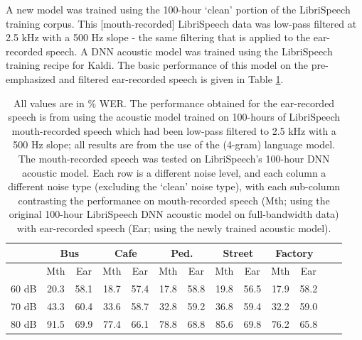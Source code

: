 A new model was trained using the 100-hour `clean' portion of the LibriSpeech training corpus.  This [mouth-recorded] LibriSpeech data was low-pass filtered at 2.5 kHz with a 500 Hz slope - the same filtering that is applied to the ear-recorded speech.  A DNN acoustic model was trained using the LibriSpeech training recipe for Kaldi. The basic performance of this model on the pre-emphasized and filtered ear-recorded speech is given in Table \ref{tab:retrainedDNN}.

\begin{table}[h]
\begin{center}
\begin{tabular}{| c || c | c | c | c | c | c | c | c | c | c | c | c |} \hline
      & \multicolumn{2}{|c|}{Bus} & \multicolumn{2}{|c|}{Cafe} & \multicolumn{2}{|c|}{Ped.} & \multicolumn{2}{|c|}{Street} & \multicolumn{2}{|c|}{Factory} \\ \hline
      & Mth & Ear & Mth & Ear & Mth & Ear & Mth & Ear & Mth & Ear \\ \hline\hline
60 dB & 20.3 & 58.1 & 18.7 & 57.4 & 17.8 & 58.8 & 19.8 & 56.5 & 17.9 & 58.2  \\ \hline
70 dB & 43.3 & 60.4 & 33.6 & 58.7 & 32.8 & 59.2 & 36.8 & 59.4 & 32.2 & 59.0  \\ \hline
80 dB & 91.5 & 69.9 & 77.4 & 66.1 & 78.8 & 68.8 & 85.6 & 69.8 & 76.2 & 65.8  \\ \hline
\end{tabular}
\end{center}
\caption{All values are in \% WER. The performance obtained for the ear-recorded speech is from using the acoustic model trained on 100-hours of LibriSpeech mouth-recorded speech which had been low-pass filtered to 2.5 kHz with a 500 Hz slope; all results are from the use of the (4-gram) language model.  The mouth-recorded speech was tested on LibriSpeech's 100-hour DNN acoustic model.  Each row is a different noise level, and each column a different noise type (excluding the `clean' noise type), with each sub-column contrasting the performance on mouth-recorded speech (Mth; using the original 100-hour LibriSpeech DNN acoustic model on full-bandwidth data) with ear-recorded speech (Ear; using the newly trained acoustic model).}\label{tab:retrainedDNN}
\end{table}

